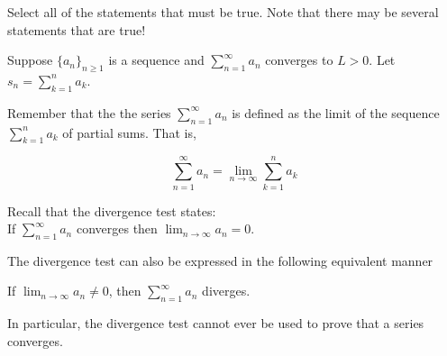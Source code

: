 \documentclass{ximera}
\author{Jim Talamo and Jason Miller}
\begin{document}
\begin{exercise}


Select all of the statements that must be true.  Note that there may be several statements that are true! 

 Suppose $\displaystyle\{a_n\}_{n \geq 1}$ is a sequence and $\displaystyle \sum^{\infty}_{n= 1} a_n$ converges to $L>0$.  Let $s_n =\displaystyle  \sum^n_{k=1} a_k$.

\begin{selectAll}
\end{selectAll}

\begin{hint}
Remember that the the series $\sum^{\infty}_{n=1} a_n$ is defined as the limit of the sequence $\sum^{n}_{k=1} a_k$ of partial sums. That is, 

\[
\sum^{\infty}_{n=1} a_n = \lim_{n \to \infty} \sum^n_{k=1} a_k
\]
\end{hint}


\begin{hint}
Recall that the divergence test states: \\
If $\sum^{\infty}_{n=1} a_n $ converges then $\lim_{n \to \infty} a_n=0$. 

The divergence test can also be expressed in the following equivalent manner

If $\lim_{n \to \infty} a_n \neq 0$, then $\sum^{\infty}_{n=1} a_n$ diverges. 

In particular, the divergence test cannot ever be used to prove that a series converges.
\end{hint}

\end{exercise}
\end{document}
